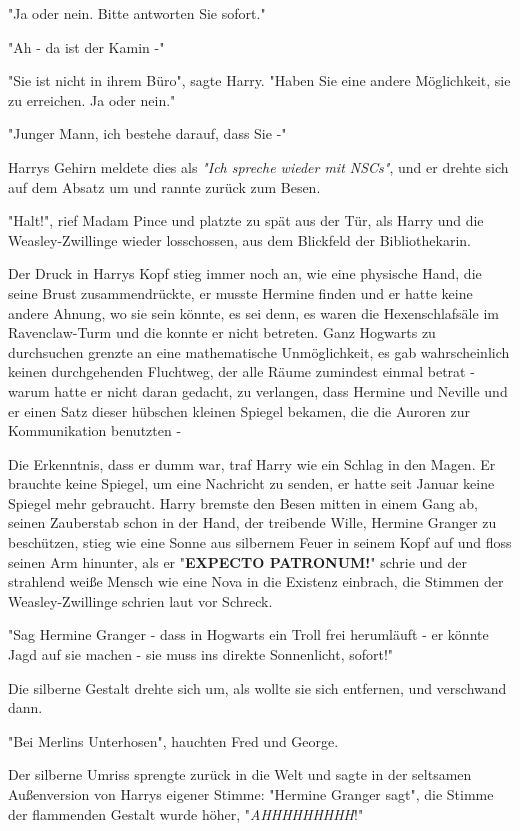 {"Ja oder nein. Bitte antworten Sie sofort."

"Ah - da ist der Kamin -"

"Sie ist nicht in ihrem Büro", sagte Harry. "Haben Sie eine andere Möglichkeit, sie zu erreichen. Ja oder nein."

"Junger Mann, ich bestehe darauf, dass Sie -"

Harrys Gehirn meldete dies als \emph{"Ich spreche wieder mit NSCs"}, und er drehte sich auf dem Absatz um und rannte zurück zum Besen.

"Halt!", rief Madam Pince und platzte zu spät aus der Tür, als Harry und die Weasley-Zwillinge wieder losschossen, aus dem Blickfeld der Bibliothekarin.

Der Druck in Harrys Kopf stieg immer noch an, wie eine physische Hand, die seine Brust zusammendrückte, er musste Hermine finden und er hatte keine andere Ahnung, wo sie sein könnte, es sei denn, es waren die Hexenschlafsäle im Ravenclaw-Turm und die konnte er nicht betreten. Ganz Hogwarts zu durchsuchen grenzte an eine mathematische Unmöglichkeit, es gab wahrscheinlich keinen durchgehenden Fluchtweg, der alle Räume zumindest einmal betrat - warum hatte er nicht daran gedacht, zu verlangen, dass Hermine und Neville und er einen Satz dieser hübschen kleinen Spiegel bekamen, die die Auroren zur Kommunikation benutzten -

Die Erkenntnis, dass er dumm war, traf Harry wie ein Schlag in den Magen. Er brauchte keine Spiegel, um eine Nachricht zu senden, er hatte seit Januar keine Spiegel mehr gebraucht. Harry bremste den Besen mitten in einem Gang ab, seinen Zauberstab schon in der Hand, der treibende Wille, Hermine Granger zu beschützen, stieg wie eine Sonne aus silbernem Feuer in seinem Kopf auf und floss seinen Arm hinunter, als er "\textbf{EXPECTO PATRONUM!}" schrie und der strahlend weiße Mensch wie eine Nova in die Existenz einbrach, die Stimmen der Weasley-Zwillinge schrien laut vor Schreck.

"Sag Hermine Granger - dass in Hogwarts ein Troll frei herumläuft - er könnte Jagd auf sie machen - sie muss ins direkte Sonnenlicht, sofort!"

Die silberne Gestalt drehte sich um, als wollte sie sich entfernen, und verschwand dann.

"Bei Merlins Unterhosen", hauchten Fred und George.

Der silberne Umriss sprengte zurück in die Welt und sagte in der seltsamen Außenversion von Harrys eigener Stimme: "Hermine Granger sagt", die Stimme der flammenden Gestalt wurde höher, "\emph{AHHHHHHHHH}!"

}
